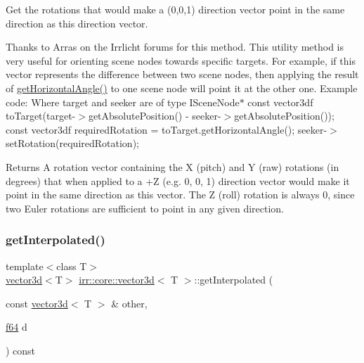Get the rotations that would make a (0,0,1) direction vector point in the same direction as this direction vector. 

Thanks to Arras on the Irrlicht forums for this method. This utility method is very useful for orienting scene nodes towards specific targets. For example, if this vector represents the difference between two scene nodes, then applying the result of \hyperlink{classirr_1_1core_1_1vector3d_a2c622aa988b4ea1d2e381632f99f8015}{get\+Horizontal\+Angle()} to one scene node will point it at the other one. Example code\+: Where target and seeker are of type I\+Scene\+Node$\ast$ const vector3df to\+Target(target-\/$>$get\+Absolute\+Position() -\/ seeker-\/$>$get\+Absolute\+Position()); const vector3df required\+Rotation = to\+Target.\+get\+Horizontal\+Angle(); seeker-\/$>$set\+Rotation(required\+Rotation);

\begin{DoxyReturn}{Returns}
A rotation vector containing the X (pitch) and Y (raw) rotations (in degrees) that when applied to a +Z (e.\+g. 0, 0, 1) direction vector would make it point in the same direction as this vector. The Z (roll) rotation is always 0, since two Euler rotations are sufficient to point in any given direction. 
\end{DoxyReturn}
\mbox{\label{classirr_1_1core_1_1vector3d_aee3351232fa6ebd6241a89bebdaeaedf}} 
\subsubsection{\texorpdfstring{get\+Interpolated()}{getInterpolated()}}
{\footnotesize\ttfamily template$<$class T$>$ \\
\hyperlink{classirr_1_1core_1_1vector3d}{vector3d}$<$T$>$ \hyperlink{classirr_1_1core_1_1vector3d}{irr\+::core\+::vector3d}$<$ T $>$\+::get\+Interpolated (\begin{DoxyParamCaption}\item[{const \hyperlink{classirr_1_1core_1_1vector3d}{vector3d}$<$ T $>$ \&}]{other,  }\item[{\hyperlink{namespaceirr_a1325b02603ad449f92c68fc640af9b28}{f64}}]{d }\end{DoxyParamCaption}) const\hspace{0.3cm}{\ttfamily [inline]}}



